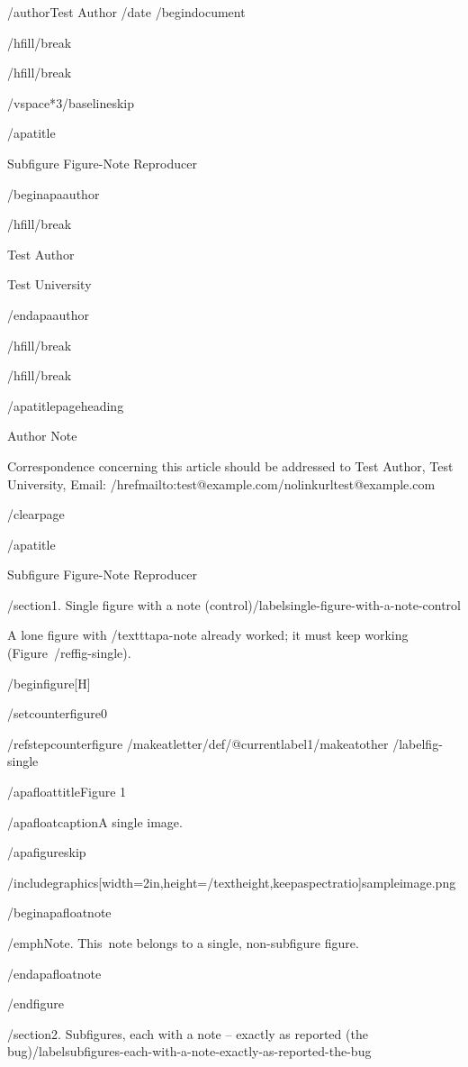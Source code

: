 /author{Test Author}
/date{}
/begin{document}


/hfill/break

/hfill/break

/vspace*{3/baselineskip}

/apatitle{

Subfigure Figure-Note Reproducer

}

/begin{apaauthor}

/hfill/break

Test Author

Test University

/end{apaauthor}

/hfill/break

/hfill/break

/apatitlepageheading{

Author Note

}

Correspondence concerning this article should be addressed to Test
Author, Test University, Email:
/href{mailto:test@example.com}{/nolinkurl{test@example.com}}

/clearpage

/apatitle{

Subfigure Figure-Note Reproducer

}

/section{1. Single figure with a note
(control)}/label{single-figure-with-a-note-control}

A lone figure with /texttt{apa-note} already worked; it must keep
working (Figure~/ref{fig-single}).

/begin{figure}[H]

/setcounter{figure}{0}

/refstepcounter{figure}%
/makeatletter/def/@currentlabel{1}/makeatother%
/label{fig-single}

/apafloattitle{Figure 1}

/apafloatcaption{A single image.}

/apafigureskip

/includegraphics[width=2in,height=/textheight,keepaspectratio]{sampleimage.png}

/begin{apafloatnote}

/emph{Note}. This~note belongs to a single, non-subfigure figure.

/end{apafloatnote}

/end{figure}

/section{2. Subfigures, each with a note -- exactly as reported (the
bug)}/label{subfigures-each-with-a-note-exactly-as-reported-the-bug}

